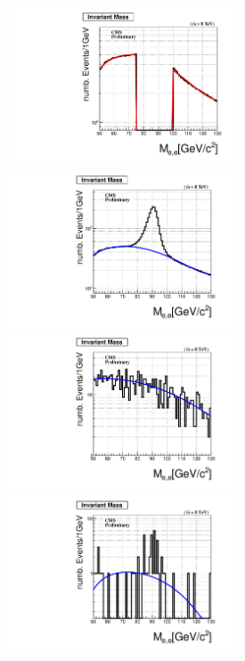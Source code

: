 \vspace{5mm}
\begin{minipage}{0.90\linewidth} 
\begin{center}
\mbox{
\includegraphics[height=0.50\textwidth, width=0.5\textwidth]{THESISPLOTS/Uncleaned-di-Photon-ZMass-Fit-DoubleElectron-Run2012A.pdf} \quad
\includegraphics[height=0.50\textwidth, width=0.5\textwidth]{THESISPLOTS/Background_In_ZMass-From-Di-Photon.pdf}
}
\mbox{
\includegraphics[height=0.50\textwidth, width=0.5\textwidth]{THESISPLOTS/Early-Time-Z-Events.pdf} \quad
\includegraphics[height=0.50\textwidth, width=0.5\textwidth]{THESISPLOTS/Late-Time-Z-Events.pdf}
}
\end{center}
\end{minipage}
